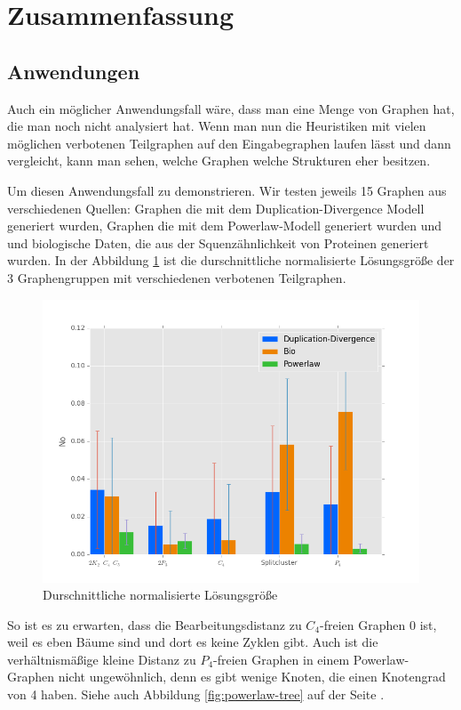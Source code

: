\documentclass[12pt,a4paper,onecolumn,oneside,titlepage]{article}
\begin{document}
\section{Zusammenfassung}
\subsection{Anwendungen}
Auch ein möglicher Anwendungsfall wäre, dass man eine Menge von Graphen hat, die man noch nicht analysiert hat. Wenn man nun die Heuristiken mit vielen möglichen verbotenen Teilgraphen auf den Eingabegraphen laufen lässt und dann vergleicht, kann man sehen, welche Graphen welche Strukturen eher besitzen.

Um diesen Anwendungsfall zu demonstrieren. Wir testen jeweils 15 Graphen aus verschiedenen Quellen: Graphen die mit dem Duplication-Divergence Modell generiert wurden, Graphen die mit dem Powerlaw-Modell generiert wurden und und biologische Daten, die aus der Squenzähnlichkeit von Proteinen generiert wurden.
In der Abbildung \ref{fig:best-graph} ist die durschnittliche normalisierte Lösungsgröße der 3 Graphengruppen mit verschiedenen verbotenen Teilgraphen.

\begin{figure}
\includegraphics[scale=0.7]{plots/best.png} 
\caption{Durschnittliche normalisierte Lösungsgröße}
\label{fig:best-graph}
\end{figure}

So ist es zu erwarten, dass die Bearbeitungsdistanz zu $C_4$-freien Graphen 0 ist, weil es eben Bäume sind und dort es keine Zyklen gibt.
Auch ist die verhältnismäßige kleine Distanz zu $P_4$-freien Graphen in einem Powerlaw-Graphen nicht ungewöhnlich, denn es gibt wenige Knoten, die einen Knotengrad von 4 haben. Siehe auch Abbildung \ref{fig:powerlaw-tree} auf der Seite \pageref{fig:powerlaw-tree}.
\end{document}
